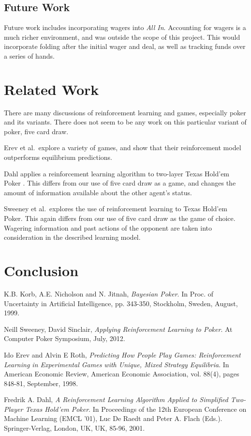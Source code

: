 \documentclass[12pt,pdftex]{article}
\begin{document}
\subsection{Future Work}
Future work includes incorporating wagers into \emph{All In}.  
Accounting for wagers is a much richer environment, and was outside the scope of this project.  
This would incorporate folding after the initial wager and deal, as well as tracking funds over a series of hands.

\section{Related Work}
There are many discussions of reinforcement learning and games, especially poker and its variants.
There does not seem to be any work on this particular variant of poker, five card draw.  

Erev et al.\ explore a variety of games, and show that their reinforcement model outperforms equilibrium predictions\cite{Erev98}.  

Dahl applies a reinforcement learning algorithm to two-layer Texas Hold'em Poker \cite{Dahl01}. 
This differs from our use of five card draw as a game, and changes the amount of information available about the other agent's status. 

Sweeney et al.\ explores the use of reinforcement learning to Texas Hold'em Poker\cite{Sweeney}.
This again differs from our use of five card draw as the game of choice.  
Wagering information and past actions of the opponent are taken into consideration in the described learning model.

\section{Conclusion}



%
\begin{thebibliography}{9}
K.B. Korb, A.E. Nicholson and N. Jitnah,
 \emph{Bayesian Poker}. 
In Proc. of Uncertainty in Artificial Intelligence, pp. 343-350, 
Stockholm, Sweden, August, 1999.


Neill Sweeney, David Sinclair,
	\emph{Applying Reinforcement Learning to Poker}.
At Computer Poker Symposium, July, 2012.

Ido Erev and  Alvin E Roth, 
\emph{Predicting How People Play Games: Reinforcement Learning in Experimental Games with Unique, Mixed Strategy Equilibria}.
In American Economic Review, American Economic Association, vol. 88(4), pages 848-81, September, 1998.

Fredrik A. Dahl, 
\emph{A Reinforcement Learning Algorithm Applied to Simplified Two-Player Texas Hold'em Poker}. 
In Proceedings of the 12th European Conference on Machine Learning (EMCL '01), Luc De Raedt and Peter A. Flach (Eds.). Springer-Verlag, London, UK, UK, 85-96, 2001.
\end{thebibliography}
\end{document}
